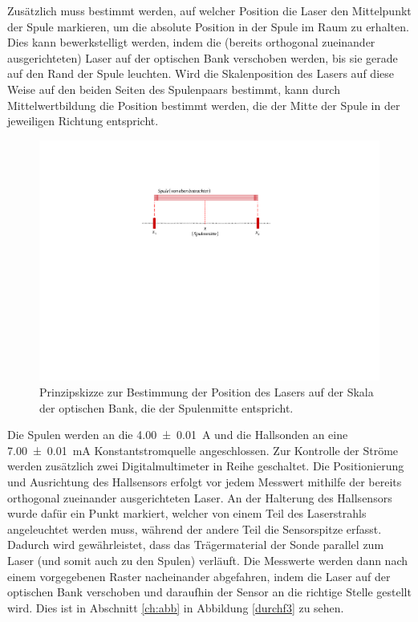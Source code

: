 \documentclass[12pt,a4paper]{article}
\begin{document}
Zusätzlich muss bestimmt werden, auf welcher Position die Laser den Mittelpunkt der Spule markieren, um die absolute Position in der Spule im Raum zu erhalten. Dies kann bewerkstelligt werden, indem die (bereits orthogonal zueinander ausgerichteten) Laser auf der optischen Bank verschoben werden, bis sie gerade auf den Rand der Spule leuchten. Wird die Skalenposition des Lasers auf diese Weise auf den beiden Seiten des Spulenpaars bestimmt, kann durch Mittelwertbildung die Position bestimmt werden, die der Mitte der Spule in der jeweiligen Richtung entspricht. \\
\begin{figure}[H]
	\centering
	\includegraphics[scale=0.8]{pos1.pdf}
	\caption{Prinzipskizze zur Bestimmung der Position des Lasers auf der Skala der optischen Bank, die der Spulenmitte entspricht.}
	\label{fig:pos1}
\end{figure}

Die Spulen werden an die \SI{4.00(1)}{\ampere} und die Hallsonden an eine \SI{7.00(1)}{\milli \ampere} Konstantstromquelle angeschlossen. Zur Kontrolle der Ströme werden zusätzlich zwei Digitalmultimeter in Reihe geschaltet. Die Positionierung und Ausrichtung des Hallsensors erfolgt vor jedem Messwert mithilfe der bereits orthogonal zueinander ausgerichteten Laser. An der Halterung des Hallsensors wurde dafür ein Punkt markiert, welcher von einem Teil des Laserstrahls angeleuchtet werden muss, während der andere Teil die Sensorspitze erfasst. Dadurch wird gewährleistet, dass das Trägermaterial der Sonde parallel zum Laser (und somit auch zu den Spulen) verläuft. Die Messwerte werden dann nach einem vorgegebenen Raster nacheinander abgefahren, indem die Laser auf der optischen Bank verschoben und daraufhin der Sensor an die richtige Stelle gestellt wird. Dies ist in Abschnitt \ref{ch:abb} in Abbildung \ref{durchf3} zu sehen.\\
\end{document}
